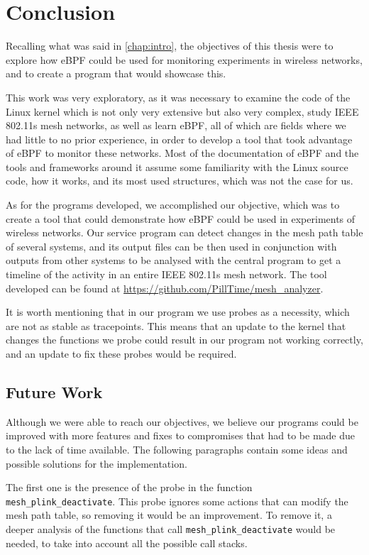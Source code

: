 \chapter{Conclusion}\label{chap:conc}

Recalling what was said in \autoref{chap:intro}, the objectives of this thesis
were to explore how eBPF could be used for monitoring experiments in wireless
networks, and to create a program that would showcase this.

This work was very exploratory, as it was necessary to examine the code of the
Linux kernel which is not only very extensive but also very complex, study
\ac{IEEE} 802.11s mesh networks, as well as learn eBPF, all of which are fields
where we had little to no prior experience, in order to develop a tool that took
advantage of eBPF to monitor these networks. Most of the documentation of eBPF
and the tools and frameworks around it assume some familiarity with the Linux
source code, how it works, and its most used structures, which was not the case
for us.

As for the programs developed, we accomplished our objective, which was to
create a tool that could demonstrate how eBPF could be used in experiments of
wireless networks. Our service program can detect changes in the mesh path table
of several systems, and its output files can be then used in conjunction with
outputs from other systems to be analysed with the central program to get a
timeline of the activity in an entire \ac{IEEE} 802.11s mesh network. The tool
developed can be found at \url{https://github.com/PillTime/mesh_analyzer}.

It is worth mentioning that in our program we use probes as a necessity, which
are not as stable as tracepoints. This means that an update to the kernel that
changes the functions we probe could result in our program not working
correctly, and an update to fix these probes would be required.


\section{Future Work}

Although we were able to reach our objectives, we believe our programs could be
improved with more features and fixes to compromises that had to be made due to
the lack of time available. The following paragraphs contain some ideas and
possible solutions for the implementation.

The first one is the presence of the probe in the function
\texttt{mesh\_plink\_deactivate}. This probe ignores some actions that can
modify the mesh path table, so removing it would be an improvement. To remove
it, a deeper analysis of the functions that call
\texttt{mesh\_plink\_deactivate} would be needed, to take into account all the
possible call stacks.

